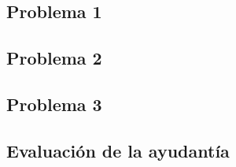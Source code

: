 \documentclass[letterpaper]{article}
\begin{document}


\subsection*{Problema 1}


\subsection*{Problema 2}


\subsection*{Problema 3}


\newpage

\subsection*{Evaluación de la ayudantía}

\end{document}
